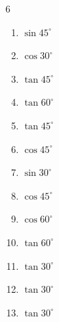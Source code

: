 \begin{multicols}{6}
\begin{enumerate}
  \item $\displaystyle \sin{45^\circ}$


  \item $\displaystyle \cos{30^\circ}$


\columnbreak %

  \item $\displaystyle \tan{45^\circ}$

        \phantom{$\displaystyle =1$}

  \item $\displaystyle \tan{60^\circ}$


  \item $\displaystyle \tan{45^\circ}$

        \phantom{$\displaystyle =1$}

  \item $\displaystyle \cos{45^\circ}$


  \item $\displaystyle \sin{30^\circ}$


  \item $\displaystyle \cos{45^\circ}$


  \item $\displaystyle \cos{60^\circ}$


  \item $\displaystyle \tan{60^\circ}$


  \item $\displaystyle \tan{30^\circ}$


  \item $\displaystyle \tan{30^\circ}$


  \item $\displaystyle \tan{30^\circ}$


\end{enumerate}
\end{multicols}
